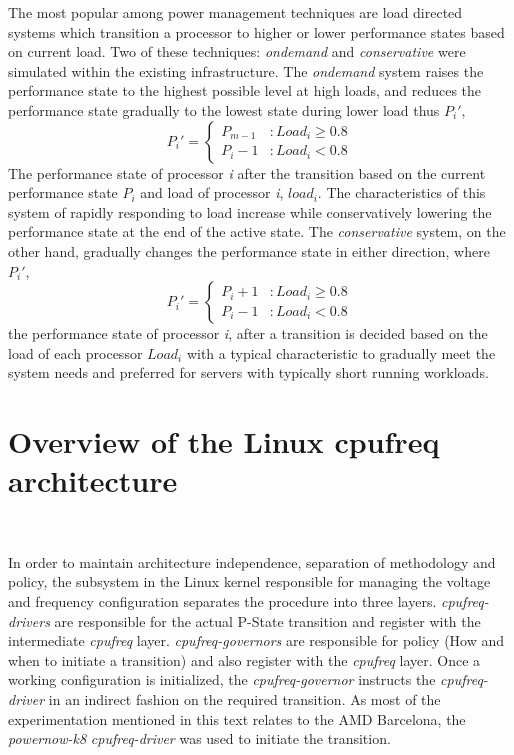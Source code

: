 The most popular among power management techniques are load directed systems
which transition a processor to higher or lower performance states based on current load. Two
of these techniques: \textit{ondemand}\cite{OnDemand} and \textit{conservative} 
were simulated within the existing infrastructure. The \textit{ondemand}
system raises the performance state to the highest possible level at high loads, and
reduces the performance state gradually to the lowest state during lower load thus $P_i'$,
\begin{equation}
    P_{i}' = \left\{ \begin{array}{lr} 
                   P_{m-1} & : Load_i \geq 0.8 \\
		   P_{i}-1 & : Load_i < 0.8
                  \end{array} \right.
\label{fig:math_ondemand}
\end{equation}
The performance state of processor \textit{i} after the transition based on the current 
performance state $P_i$ and load of processor \textit{i}, $load_i$. The characteristics of
this system of rapidly responding to load increase while conservatively lowering the performance
state at the end of the active state.
The \textit{conservative}
system, on the other hand, gradually changes the performance state in either direction, where $P_i'$,
\begin{equation}
    P_{i}' = \left\{ \begin{array}{lr} 
                   P_{i}+1 & : Load_i \geq 0.8 \\
		   P_{i}-1 & : Load_i < 0.8
                  \end{array} \right.
\label{fig:math_conservative}
\end{equation}
the performance state of processor \textit{i}, after a transition is decided based on the load of each 
processor $Load_i$ with a typical characteristic to gradually meet the system needs and preferred for
servers with typically short running workloads.

\section{Overview of the Linux cpufreq architecture}~\label{sec:cpufreq}

In order to maintain architecture independence, separation of methodology 
and policy, the subsystem in the Linux kernel responsible for managing the 
voltage and frequency configuration separates the procedure into three layers. \textit{cpufreq-drivers}
are responsible for the actual P-State transition and register with the 
intermediate \textit{cpufreq} layer. \textit{cpufreq-governors} are responsible for
policy (How and when to initiate a transition) and also register with the 
\textit{cpufreq} layer. Once a working configuration is initialized, the 
\textit{cpufreq-governor} instructs the \textit{cpufreq-driver} in an indirect
fashion on the required transition. As most of the experimentation mentioned in
this text relates to the AMD Barcelona, the \textit{powernow-k8} \textit{cpufreq-driver}
was used to initiate the transition. 

